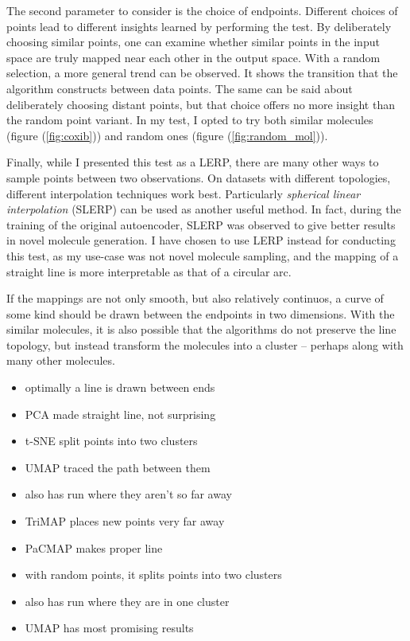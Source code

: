 The second parameter to consider is the choice of endpoints. Different choices of points lead to different insights learned by performing the test. By deliberately choosing similar points, one can examine whether similar points in the input space are truly mapped near each other in the output space. With a random selection, a more general trend can be observed. It shows the transition that the algorithm constructs between data points. The same can be said about deliberately choosing distant points, but that choice offers no more insight than the random point variant. In my test, I opted to try both similar molecules (figure (\ref{fig:coxib})) and random ones (figure (\ref{fig:random_mol})).

Finally, while I presented this test as a LERP, there are many other ways to sample points between two observations. On datasets with different topologies, different interpolation techniques work best. Particularly \textit{spherical linear interpolation} (SLERP) can be used as another useful method. In fact, during the training of the original autoencoder, SLERP was observed to give better results in novel molecule generation. \cite{bib:thesis} I have chosen to use LERP instead for conducting this test, as my use-case was not novel molecule sampling, and the mapping of a straight line is more interpretable as that of a circular arc.

If the mappings are not only smooth, but also relatively continuos, a curve of some kind should be drawn between the endpoints in two dimensions. With the similar molecules, it is also possible that the algorithms do not preserve the line topology, but instead transform the molecules into a cluster -- perhaps along with many other molecules. 



\begin{itemize}
	\item optimally a line is drawn  between ends
	\item PCA made straight line, not surprising
	\item t-SNE split points into two clusters
	\item UMAP traced the path between them
	\item also has run where they aren't so far away
	\item TriMAP places new points very far away
	\item PaCMAP makes proper line
	\item with random points, it splits points into two clusters
	\item also has run where they are in one cluster
	\item UMAP has most promising results
\end{itemize}

